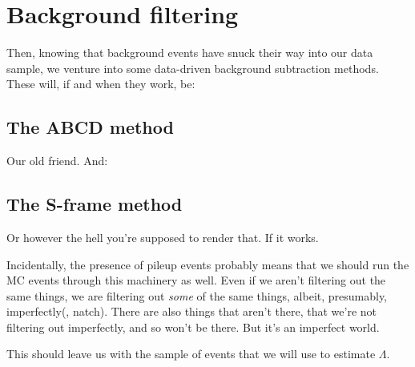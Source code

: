 \section{Background filtering}
Then, knowing that background events have snuck their way into our data sample, we venture into some data-driven background subtraction methods. These will, if and when they work, be:

\subsection{The ABCD method}
Our old friend. And:

\subsection{The S-frame method}
Or however the hell you're supposed to render that. If it works.

Incidentally, the presence of pileup events probably means that we should run the MC events through this machinery as well. Even if we aren't filtering out the same things, we are filtering out \textit{some} of the same things, albeit, presumably, imperfectly(, natch). There are also things that aren't there, that we're not filtering out imperfectly, and so won't be there. But it's an imperfect world.

This should leave us with the sample of events that we will use to estimate $\Lambda$.
